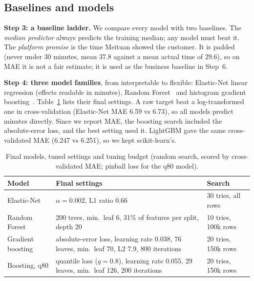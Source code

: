 \subsection{Baselines and models}
\textbf{Step 3: a baseline ladder.} We compare every model with two baselines. The \emph{median
predictor} always predicts the training median; any model must beat it. The \emph{platform promise} is
the time Meituan showed the customer. It is padded (never under 30 minutes, mean 37.8 against a mean
actual time of 29.6), so on MAE it is not a fair estimate; it is used as the business baseline in
Step~6.

\textbf{Step 4: three model families}, from interpretable to flexible: Elastic-Net linear regression
(effects readable in minutes), Random Forest~\cite{breiman2001random} and histogram gradient
boosting~\cite{friedman2001greedy,ke2017lightgbm}. Table~\ref{tab:models} lists their final settings. A raw target
beat a log-transformed one in cross-validation (Elastic-Net MAE 6.59 vs 6.73), so all models predict
minutes directly. Since we report MAE, the boosting search included the absolute-error loss, and the
best setting used it. LightGBM gave the same cross-validated MAE (6.247 vs 6.251),
so we kept scikit-learn's.

\begin{table}[t]
\centering
\caption{Final models, tuned settings and tuning budget (random search, scored by cross-validated MAE;
pinball loss for the q80 model).}
\label{tab:models}
\footnotesize
\begin{tabular}{@{}p{}p{}p{}@{}}
\toprule
Model & Final settings & Search \\
\midrule
Elastic-Net & $\alpha = 0.002$, L1 ratio $0.66$ & 30 tries, all rows \\
Random Forest & 200 trees, min.\ leaf 6, 31\% of features per split, depth 20 & 10 tries, 100k rows \\
Gradient boosting & absolute-error loss, learning rate 0.038, 76 leaves, min.\ leaf 70, L2 7.9, 800 iterations & 20 tries, 150k rows \\
Boosting, q80 & quantile loss ($q=0.8$), learning rate 0.055, 29 leaves, min.\ leaf 126, 200 iterations & 20 tries, 150k rows \\
\bottomrule
\end{tabular}
\end{table}

